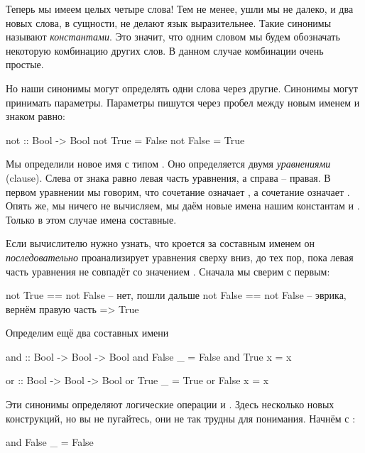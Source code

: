 Теперь мы имеем целых четыре слова! Тем не менее, ушли мы не далеко, и два новых
слова, в сущности, не делают язык выразительнее.
Такие синонимы называют \emph{константами}. Это значит, что одним словом мы будем обозначать некоторую комбинацию других слов.
В данном случае комбинации очень простые.

Но наши синонимы могут определять одни слова через другие. 
Синонимы могут принимать параметры. Параметры пишутся через
пробел между новым именем и знаком равно:

\begin{code}
not :: Bool -> Bool
not True  = False
not False = True
\end{code}

Мы определили новое имя  с типом . 
Оно определяется двумя \emph{уравнениями} (clause). Слева
от знака равно левая часть уравнения, а справа -- правая.
В первом уравнении мы говорим, что сочетание 
означает , а сочетание  означает
. Опять же, мы ничего не вычисляем, мы даём новые имена
нашим константам  и . Только в этом случае
имена составные. 

Если вычислителю нужно узнать, что кроется за составным именем
\mbox{}
он \emph{последовательно} проанализирует уравнения сверху вниз, до тех
пор, пока левая часть уравнения не совпадёт со значением .
Сначала мы сверим с первым:

\begin{code}
not True   == not False     -- нет, пошли дальше
not False  == not False     -- эврика, вернём правую часть
=> True
\end{code}



Определим ещё два составных имени 

\begin{code}
and :: Bool -> Bool -> Bool
and False  _  = False
and True   x  = x

or  :: Bool -> Bool -> Bool
or True   _ = True
or False  x = x
\end{code}

Эти синонимы определяют логические операции 
и . Здесь несколько новых конструкций, 
но вы не пугайтесь, они не так трудны для понимания. Начнём с \In{_}:

\begin{code}
and False  _  = False
\end{code}

